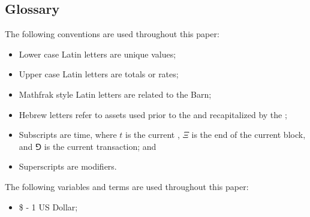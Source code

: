 \documentclass[class=article, crop=false]{standalone}
\begin{document}
\subsection{Glossary}
The following conventions are used throughout this paper:
\begin{itemize}
    \item Lower case Latin letters are unique values;
    \item Upper case Latin letters are totals or rates;
    \item Mathfrak style Latin letters are related to the Barn; 
    \item Hebrew letters refer to assets used prior to the  and recapitalized by the ;
    \item Subscripts are time, where $t$ is the current , \hypertarget{ht1}{$\Xi$} is the end of the current block, and $\Game$ is the current transaction; and
    \item Superscripts are modifiers.
\end{itemize}

The following variables and terms are used throughout this paper:
\begin{itemize}[topsep=0pt, itemsep=3pt,leftmargin=16pt]
    \item[] \$ - 1 US Dollar;
\end{itemize}
\end{document}
